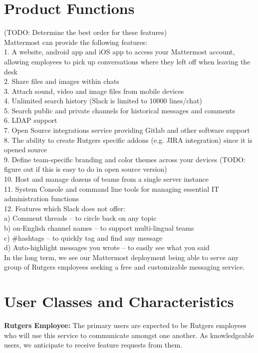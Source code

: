 \documentclass{scrreprt}
\newcommand\tab[1][0.5cm]{\hspace*{#1}}
\begin{document}
\section{Product Functions}
(TODO: Determine the best order for these features)\\
Mattermost can provide the following features:\\
\tab 1. A website, android app and iOS app to access your Mattermost
account, allowing \tab employees to pick up conversations where they left off when
leaving the desk\\
\tab 2. Share files and images within chats\\
\tab 3. Attach sound, video and image files from mobile devices\\
\tab 4. Unlimited search history (Slack is limited to 10000 lines/chat)\\
\tab 5. Search public and private channels for historical messages and
comments\\
\tab 6. LDAP support\\
\tab 7. Open Source integrations service providing Gitlab and other software
support\\
\tab 8. The ability to create Rutgers specific addons (e.g. JIRA integration) since
it is \tab opened source\\
\tab 9. Define team-specific branding and color themes across your devices (TODO:
figure \tab out if this is easy to do in open source version)\\
\tab 10. Host and manage dozens of teams from a single server instance\\
\tab 11. System Console and command line tools for managing essential IT
administration \tab functions\\
\tab 12. Features which Slack does not offer:\\
\tab\tab a) Comment threads – to circle back on any topic\\
\tab\tab b) on-English channel names – to support multi-lingual teams\\
\tab\tab c) \#hashtags – to quickly tag and find any message\\
\tab\tab d) Auto-highlight messages you wrote – to easily see what you said\\

In the long term, we see our Mattermost deployment being able to serve any group
of Rutgers employees seeking a free and customizable messaging service.

\section{User Classes and Characteristics}
\textbf{Rutgers Employee:}
\tab The primary users are expected to be Rutgers employees who will use this
service to communicate amongst one another.  As knowledgeable users, we
anticipate to receive feature requests from them.\\
\end{document}

